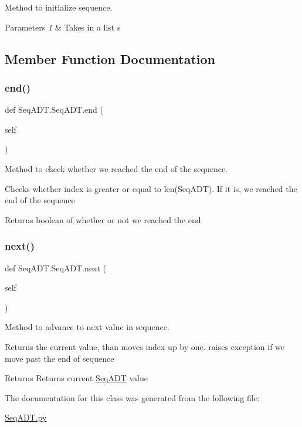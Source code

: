 Method to initialize sequence. 


\begin{DoxyParams}{Parameters}
{\em 1} & Takes in a list s \\
\hline
\end{DoxyParams}


\subsection{Member Function Documentation}
\mbox{\label{class_seq_a_d_t_1_1_seq_a_d_t_a7d8df17dae5df548ca32054075ca04b8}} 
\subsubsection{\texorpdfstring{end()}{end()}}
{\footnotesize\ttfamily def Seq\+A\+D\+T.\+Seq\+A\+D\+T.\+end (\begin{DoxyParamCaption}\item[{}]{self }\end{DoxyParamCaption})}



Method to check whether we reached the end of the sequence. 

Checks whether index is greater or equal to len(\+Seq\+A\+D\+T). If it is, we reached the end of the sequence \begin{DoxyReturn}{Returns}
boolean of whether or not we reached the end 
\end{DoxyReturn}
\mbox{\label{class_seq_a_d_t_1_1_seq_a_d_t_a1d2ee97ccd784507ae32c00150dc6fb0}} 
\subsubsection{\texorpdfstring{next()}{next()}}
{\footnotesize\ttfamily def Seq\+A\+D\+T.\+Seq\+A\+D\+T.\+next (\begin{DoxyParamCaption}\item[{}]{self }\end{DoxyParamCaption})}



Method to advance to next value in sequence. 

Returns the current value, than moves index up by one. raises exception if we move past the end of sequence \begin{DoxyReturn}{Returns}
Returns current \mbox{\hyperlink{class_seq_a_d_t_1_1_seq_a_d_t}{Seq\+A\+DT}} value 
\end{DoxyReturn}


The documentation for this class was generated from the following file\+:\begin{DoxyCompactItemize}
\item 
\mbox{\hyperlink{_seq_a_d_t_8py}{Seq\+A\+D\+T.\+py}}\end{DoxyCompactItemize}
